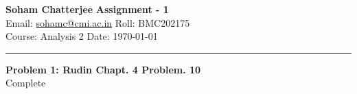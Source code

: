 \documentclass[a4paper, 11pt]{article}
\newenvironment{problem}[2][Problem]
    { \begin{mdframed}[backgroundcolor=gray!20] \textbf{#1 #2} \\}
    {  \end{mdframed}}
\begin{document}


\noindent \large\textbf{Soham Chatterjee} \hfill \textbf{Assignment - 1}\\
Email: \href{sohamc@cmi.ac.in}{sohamc@cmi.ac.in} \hfill Roll: BMC202175\\
\normalsize Course: Analysis 2 \hfill Date: \today \\
\noindent\rule{7in}{2.8pt}


\begin{problem}{1: Rudin Chapt. 4 Problem. 10}
    Complete
\end{problem}
\end{document}
